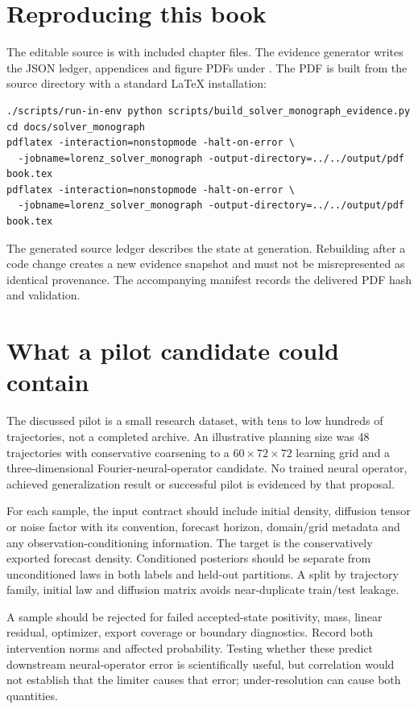 \section{Reproducing this book}
The editable source is  with included chapter files. The evidence generator writes the JSON ledger, appendices and figure PDFs under . The PDF is built from the source directory with a standard LaTeX installation:
\begin{lstlisting}
./scripts/run-in-env python scripts/build_solver_monograph_evidence.py
cd docs/solver_monograph
pdflatex -interaction=nonstopmode -halt-on-error \
  -jobname=lorenz_solver_monograph -output-directory=../../output/pdf book.tex
pdflatex -interaction=nonstopmode -halt-on-error \
  -jobname=lorenz_solver_monograph -output-directory=../../output/pdf book.tex
\end{lstlisting}
The generated source ledger describes the state at generation. Rebuilding after a code change creates a new evidence snapshot and must not be misrepresented as identical provenance. The accompanying manifest records the delivered PDF hash and validation.

\section{What a pilot candidate could contain}
The discussed pilot is a small research dataset, with tens to low hundreds of trajectories, not a completed archive. An illustrative planning size was 48 trajectories with conservative coarsening to a $60\times72\times72$ learning grid and a three-dimensional Fourier-neural-operator candidate. No trained neural operator, achieved generalization result or successful pilot is evidenced by that proposal.

For each sample, the input contract should include initial density, diffusion tensor or noise factor with its convention, forecast horizon, domain/grid metadata and any observation-conditioning information. The target is the conservatively exported forecast density. Conditioned posteriors should be separate from unconditioned laws in both labels and held-out partitions. A split by trajectory family, initial law and diffusion matrix avoids near-duplicate train/test leakage.

A sample should be rejected for failed accepted-state positivity, mass, linear residual, optimizer, export coverage or boundary diagnostics. Record both intervention norms and affected probability. Testing whether these predict downstream neural-operator error is scientifically useful, but correlation would not establish that the limiter causes that error; under-resolution can cause both quantities.

